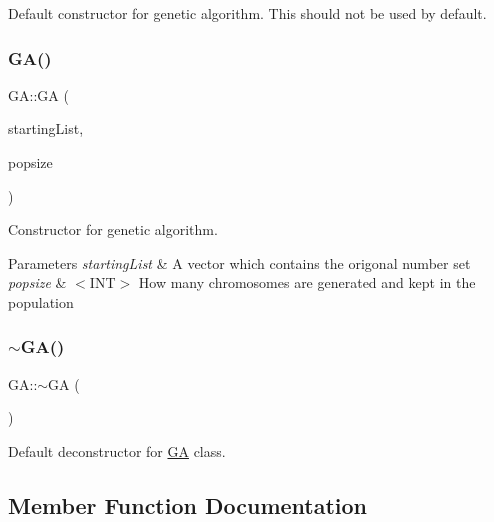 Default constructor for genetic algorithm. This should not be used by default. 

\hypertarget{class_g_a_a523a5fa03652f94984ba5454632ec385}{}\label{class_g_a_a523a5fa03652f94984ba5454632ec385} 
\subsubsection{\texorpdfstring{G\+A()}{GA()}\hspace{0.1cm}{\footnotesize\ttfamily [2/2]}}
{\footnotesize\ttfamily G\+A\+::\+GA (\begin{DoxyParamCaption}\item[{std\+::vector$<$ int $>$}]{starting\+List,  }\item[{int}]{popsize }\end{DoxyParamCaption})}



Constructor for genetic algorithm. 


\begin{DoxyParams}{Parameters}
{\em starting\+List} & A vector which contains the origonal number set \\
\hline
{\em popsize} & $<$\+I\+N\+T$>$ How many chromosomes are generated and kept in the population \\
\hline
\end{DoxyParams}
\hypertarget{class_g_a_a18975e5b8b24b68b2d783ae3080845c9}{}\label{class_g_a_a18975e5b8b24b68b2d783ae3080845c9} 
\subsubsection{\texorpdfstring{$\sim$\+G\+A()}{~GA()}}
{\footnotesize\ttfamily G\+A\+::$\sim$\+GA (\begin{DoxyParamCaption}{ }\end{DoxyParamCaption})}



Default deconstructor for \hyperlink{class_g_a}{GA} class. 



\subsection{Member Function Documentation}
\hypertarget{class_g_a_a3dd11c58a07b6d73b7eeaed2821ac762}{}\label{class_g_a_a3dd11c58a07b6d73b7eeaed2821ac762} 
